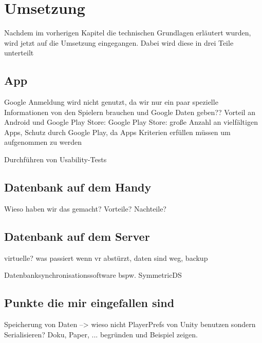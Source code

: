 \chapter{Umsetzung}

Nachdem im vorherigen Kapitel die technischen Grundlagen erläutert wurden, wird jetzt auf die Umsetzung eingegangen. Dabei wird diese in drei Teile unterteilt

\section{App}
Google Anmeldung wird nicht genutzt, da wir nur ein paar spezielle Informationen von den Spielern brauchen und Google Daten geben??
Vorteil an Android und Google Play Store: Google Play Store: große Anzahl an vielfältigen Apps, Schutz durch Google Play, da Apps Kriterien erfüllen müssen um aufgenommen zu werden

		Durchführen von Usability-Tests

\section{Datenbank auf dem Handy}
Wieso haben wir das gemacht? Vorteile? Nachteile?
	
\section{Datenbank auf dem Server}
virtuelle? was passiert wenn vr abstürzt, daten sind weg, backup

Datenbanksynchronisationssoftware bspw. SymmetricDS

\section{Punkte die mir eingefallen sind}
Speicherung von Daten --> wieso nicht PlayerPrefs von Unity benutzen sondern Serialisieren? Doku, Paper, ... begründen und Beispiel zeigen.